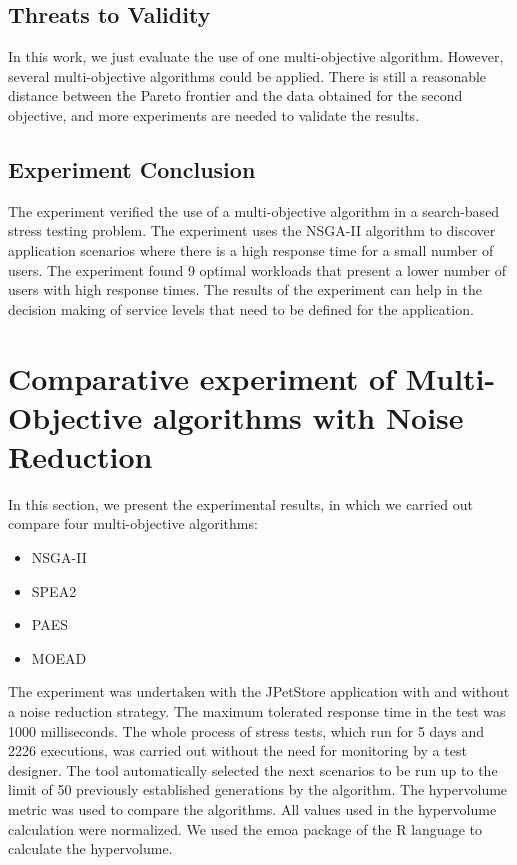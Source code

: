 \documentclass[espaco=umemeio,chapter=TITLE,twoside,openright]{abnt}
\begin{document}
\subsection{Threats to Validity}

In this work, we just evaluate the use of one multi-objective algorithm. However, several multi-objective algorithms could be applied.  There is still a reasonable distance between the Pareto frontier and the data obtained for the second objective, and more experiments are needed to validate the results.

\subsection{Experiment Conclusion}


The experiment verified the use of a multi-objective algorithm in a search-based stress testing problem. The experiment uses the NSGA-II algorithm to discover application scenarios where there is a high response time for a small number of users. The experiment found 9 optimal workloads that present a lower number of users with high response times. The results of the experiment can help in the decision making of service levels that need to be defined for the application.

\section{Comparative experiment of Multi-Objective algorithms with Noise Reduction}


In this section, we present the experimental results, in which we carried out compare four multi-objective algorithms:

\begin{itemize}
\item NSGA-II
\item SPEA2
\item PAES
\item MOEAD
\end{itemize}

The experiment was undertaken with the JPetStore application with and without a noise reduction strategy. The maximum tolerated response time in the test was 1000 milliseconds.  The whole process of stress tests, which run for 5 days and 2226 executions, was carried out without the need for monitoring by a test designer. The tool automatically selected the next scenarios to be run up to the limit of 50 previously established generations by the algorithm. The hypervolume metric was used to compare the algorithms.  All values used in the hypervolume calculation were normalized. We used the emoa package of the R language to calculate the hypervolume.
\end{document}
